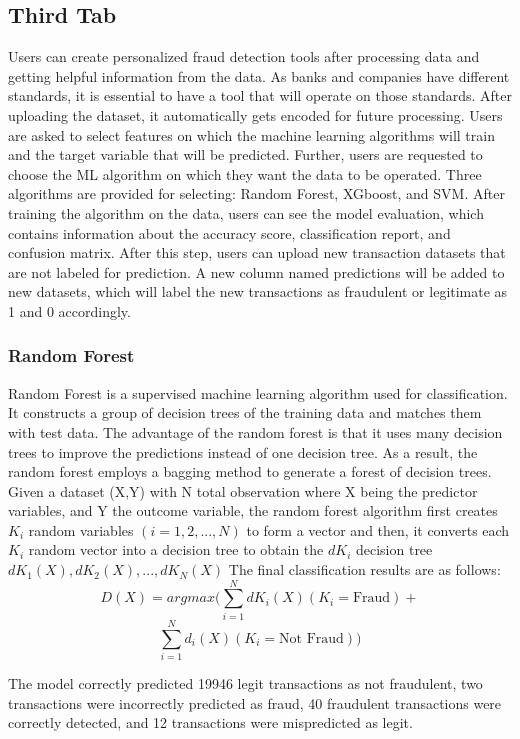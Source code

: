 \documentclass[a4paper,twocolumn,12pt]{article}
\begin{document}
\subsection{Third Tab}

Users can create personalized fraud detection tools after processing data and getting helpful information from the data. As banks and companies have different standards, it is essential to have a tool that will operate on those standards. After uploading the dataset, it automatically gets encoded for future processing. Users are asked to select features on which the machine learning algorithms will train and the target variable that will be predicted. Further, users are requested to choose the ML algorithm on which they want the data to be operated. Three algorithms are provided for selecting: Random Forest, XGboost, and SVM. After training the algorithm on the data, users can see the model evaluation, which contains information about the accuracy score, classification report, and confusion matrix. After this step, users can upload new transaction datasets that are not labeled for prediction. A new column named predictions will be added to new datasets, which will label the new transactions as fraudulent or legitimate as 1 and 0 accordingly. 



\subsubsection{Random Forest}

Random Forest is a supervised machine learning algorithm used for classification. It constructs a group of decision trees of the training data and matches them with test data. The advantage of the random forest is that it uses many decision trees to improve the predictions instead of one decision tree. As a result, the random forest employs a bagging method to generate a forest of decision trees. Given a dataset (X,Y) with N total observation where X being the predictor variables, and Y the outcome variable, the random forest algorithm first creates \(K_i\) random variables \((i = 1,2,...,N)\) to form a vector and then, it converts each \(K_i\) random vector into a decision tree to obtain the \(dK_i\) decision tree \(dK_1(X),dK_2(X),...,dK_N(X)\) The final classification results are as follows:\cite{afriyie2023supervised} \[D(X) = argmax( \sum_{i=1}^N dK_i(X) (K_i = \text{Fraud}) +\]  
\[\sum_{i=1}^N d_i(X) (K_i = \text{Not Fraud}))
\]

The model correctly predicted 19946 legit transactions as not fraudulent, two transactions were incorrectly predicted as fraud, 40 fraudulent transactions were correctly detected, and 12 transactions were mispredicted as legit. 
\end{document}
